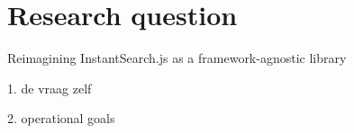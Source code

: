 
\chapter{Research question} %
\label{chp:research_question}

Reimagining InstantSearch.js as a framework-agnostic library

1. de vraag zelf

2. operational goals

\lipsum[2]
